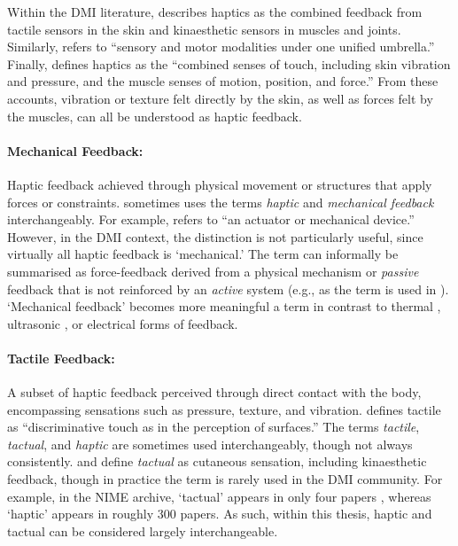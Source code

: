 Within the DMI literature, \textcite{omodhrain_playing_2000} describes haptics as the combined feedback from tactile sensors in the skin and kinaesthetic sensors in muscles and joints. Similarly, \textcite{rovan_typology_2000} refers to ``sensory and motor modalities under one unified umbrella.'' Finally, \textcite{cook_remutualizing_2004} defines haptics as the ``combined senses of touch, including skin vibration and pressure, and the muscle senses of motion, position, and force.'' From these accounts, vibration or texture felt directly by the skin, as well as forces felt by the muscles, can all be understood as haptic feedback.  

\paragraph{Mechanical Feedback:} Haptic feedback achieved through physical movement or structures that apply forces or constraints. \textcite{rovan_typology_2000} sometimes uses the terms \emph{haptic} and \emph{mechanical feedback} interchangeably. For example, \textcite{hayes_vibrotactile_2011} refers to ``an actuator or mechanical device.'' However, in the DMI context, the distinction is not particularly useful, since virtually all haptic feedback is `mechanical.' The term can informally be summarised as force-feedback derived from a physical mechanism \cite{memis_hyper-ney_2024} or \textit{passive} feedback that is not reinforced by an \textit{active} system \cite{cook_remutualizing_2004} (e.g., as the term is used in  \textcite{montag_low-cost_2011}). `Mechanical feedback' becomes more meaningful a term in contrast to thermal \cite{miyashita_thermoscore_2004}, ultrasonic \cite{hwang_airpiano_2017}, or electrical \cite{altinsoy_electrotactile_2011} forms of feedback.


\paragraph{Tactile Feedback:} A subset of haptic feedback perceived through direct contact with the body, encompassing sensations such as pressure, texture, and vibration. \textcite{rovan_typology_2000} defines tactile as ``discriminative touch as in the perception of surfaces.'' The terms \emph{tactile}, \emph{tactual}, and \emph{haptic} are sometimes used interchangeably, though not always consistently. \textcite{bongers_tactual_1998} and \textcite{srinivasan_tactual_1996} define \emph{tactual} as cutaneous sensation, including kinaesthetic feedback, though in practice the term is rarely used in the DMI community. For example, in the NIME archive, `tactual' appears in only four papers \cite{gunther_multi_2002,pardue_hand_2013,spapetti_multi_2015,ferris_musical_2002}, whereas `haptic' appears in roughly 300 papers. As such, within this thesis, haptic and tactual can be considered largely interchangeable.  

